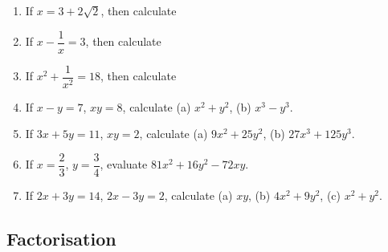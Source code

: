 \documentclass[12pt,a4paper,twoside]{book}
\begin{document}
\begin{enumerate}
\begin{enumerate}[label=(\alph*)]
\end{enumerate}
		\item If $x=3+2\sqrt{2}$, then
		calculate 		\begin{enumerate}[label=(\alph*)]
			\end{enumerate}
		\item If $x-\dfrac{1}{x}=3$, then calculate
		\begin{enumerate}[label=(\alph*)]
			\end{enumerate}
		\item If $x^2+\dfrac{1}{x^2}=18$, then calculate
		\begin{enumerate}[label=(\alph*)]
			\end{enumerate}
		\item If $x-y=7$, $xy=8$, calculate (a) $x^2+y^2$, (b) $x^3-y^3$.
		\item If $3x+5y=11$, $xy=2$, calculate (a) $9x^2+25y^2$, (b) $27x^3+125y^3$.
		\item If $x=\dfrac{2}{3}$, $y=\dfrac{3}{4}$, evaluate $81x^2+16y^2-72xy$.
		\item If $2x+3y=14$, $2x-3y=2$, calculate (a) $xy$, (b) $4x^2+9y^2$, (c) $x^2+y^2$.
		\end{enumerate}
		\subsection{Factorisation}
		
\end{document}
